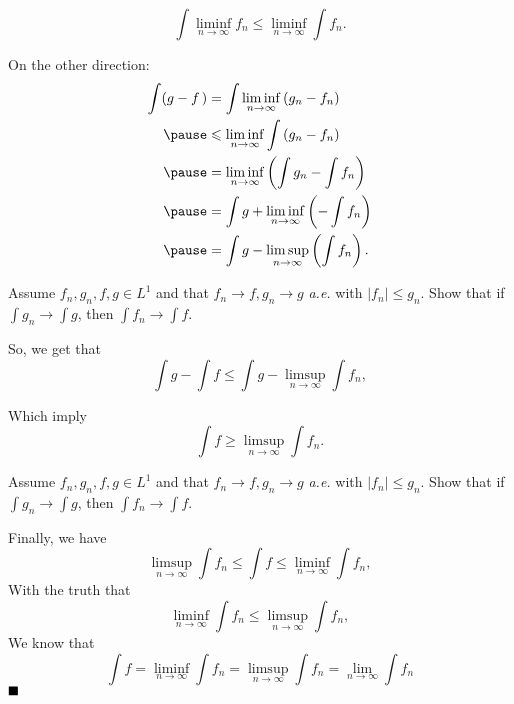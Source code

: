 \documentclass[11pt]{beamer}
\newenvironment{exercise}[1][\textsc{Exercise }\thesection.\refstepcounter{exercise}\theexercise]{\begin{tcolorbox}[colback=black!15, colframe=black!80, breakable, title=\textsc{Exercise }#1]}{\end{tcolorbox}}
\newenvironment{other}[1][\textsc{Exercise }\thesection.\refstepcounter{exercise}\theexercise]{\begin{tcolorbox}[colback=black!15, colframe=black!80, breakable, title=#1]}{\end{tcolorbox}}
\begin{document}
    \begin{frame}[plain]
        \begin{other}[Fatou's lemma: ] 
            \[
                \int \liminf _{n\to \infty }f_{n}\leqslant \liminf _{n\to \infty }\int f_{n}. 
            \]
        \end{other}
        \vspace*{10pt}
        On the other direction: 
        \begin{equation*}
            \begin{aligned}
            \int(g-f\,)
            &=\int \liminf _{n\to\infty}\left(g_{n}-f_{n}\right) \\ \pause
            &\leqslant \liminf _{n\to\infty} \int\left(g_{n}-f_{n}\right)\\ \pause
            &=\liminf _{n\to\infty}\left(\int g_{n}-\int f_{n}\right) \\ \pause
            &=\int g+\liminf_{n\to\infty} \left(-\int f_{n}\right)\\ \pause
            &=\int g-\limsup _{n\to\infty} \left(\int f_{n}\right). 
            \end{aligned}
        \end{equation*}
    \end{frame}

    \begin{frame}[plain]
        \begin{exercise}[(5)] 
            Assume $f_{n}, g_{n}, f, g \in L^{1}$ and that $f_{n} \rightarrow f, g_{n} \rightarrow g$ \emph{a.e.} with $\left|f_{n}\right| \leqslant g_{n}$. Show that if $\int g_{n} \rightarrow \int g$, then $\int f_{n} \rightarrow \int f$. 
        \end{exercise}
        \vspace*{10pt}So, we get that
        \[
            \int g-\int f \leqslant\int g-\limsup_{n\to\infty}\int f_n, 
        \]

        \vspace*{10pt}Which imply 
        \[
            \int f\geqslant\limsup_{n\to\infty}\int f_n. 
        \]

        \vspace*{50pt}
    \end{frame}

    \begin{frame}[plain]
        \begin{exercise}[(5)] 
            Assume $f_{n}, g_{n}, f, g \in L^{1}$ and that $f_{n} \rightarrow f, g_{n} \rightarrow g$ \emph{a.e.} with $\left|f_{n}\right| \leqslant g_{n}$. Show that if $\int g_{n} \rightarrow \int g$, then $\int f_{n} \rightarrow \int f$. 
        \end{exercise}
        Finally, we have
        \[
            \limsup_{n\to\infty}\int f_n\leqslant\int f\leqslant\liminf_{n\to\infty}\int f_n, 
        \]
        With the truth that 
        \[
            \liminf_{n\to\infty}\int f_n\leqslant\limsup_{n\to\infty}\int f_n, 
        \]
        We know that 
        \[
            \int f =\liminf_{n\to\infty}\int f_n = \limsup_{n\to\infty}\int f_n = \lim_{n\to\infty} \int f_n
        \]
        $\hfill \blacksquare$
    
    \end{frame}
\end{document}
